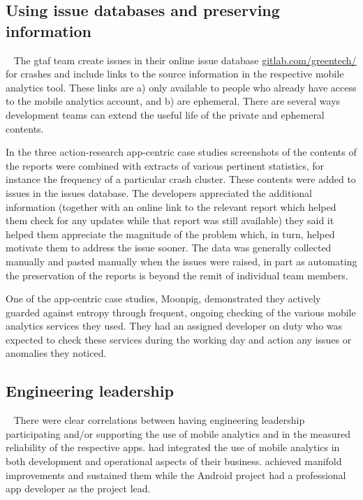 \subsection{Using issue databases and preserving information}~\label{aiu-using-issue-databases-and-preserving-information-topics}
The \Gls{gtaf} team create issues in their online issue database \href{https://gitlab.com/greentech/}{gitlab.com/greentech/} for crashes and include links to the source information in the respective mobile analytics tool. These links are a) only available to people who already have access to the mobile analytics account, and b) are ephemeral. There are several ways development teams can extend the useful life of the private and ephemeral contents. 

In the three action-research app-centric case studies screenshots of the contents of the reports were combined with extracts of various pertinent statistics, for instance the frequency of a particular crash cluster. These contents were added to issues in the issues database. The developers appreciated the additional information (together with an online link to the relevant report which helped them check for any updates while that report was still available) they said it helped them appreciate the magnitude of the problem which, in turn, helped motivate them to address the issue sooner. The data was generally collected manually and pasted manually when the issues were raised, in part as automating the preservation of the reports is beyond the remit of individual team members.

One of the app-centric case studies, Moonpig, demonstrated they actively guarded against entropy through frequent, ongoing checking of the various mobile analytics services they used. They had an assigned developer on duty who was expected to check these services during the working day and action any issues or anomalies they noticed.

\subsection{Engineering leadership}~\label{aiu-engineering-leadership-topic}
There were clear correlations between having engineering leadership participating and/or supporting the use of mobile analytics and in the measured reliability of the respective apps.  had integrated the use of mobile analytics in both development and operational aspects of their business.  achieved manifold improvements and sustained them while the Android project had a professional app developer as the project lead. 

